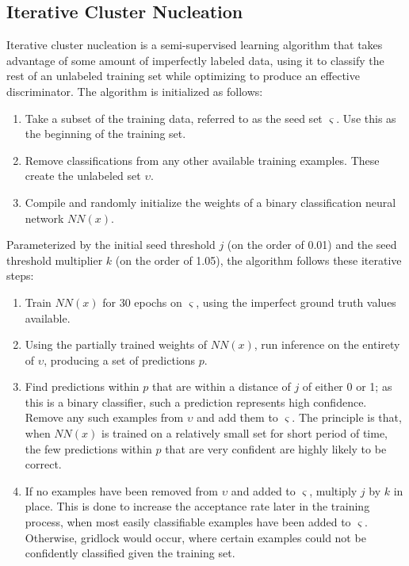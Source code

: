 \documentclass[10pt]{article}
\begin{document}
\subsection{Iterative Cluster Nucleation}

Iterative cluster nucleation is a semi-supervised learning algorithm that takes advantage of some amount of imperfectly labeled data, using it to classify the rest of an unlabeled training set while optimizing to produce an effective discriminator. The algorithm is initialized as follows:

\begin{enumerate}
    \item Take a subset of the training data, referred to as the seed set $\varsigma$. Use this as the beginning of the training set.
    \item Remove classifications from any other available training examples. These create the unlabeled set $\upsilon$.
    \item Compile and randomly initialize the weights of a binary classification neural network $NN(x)$.
\end{enumerate}

Parameterized by the initial seed threshold $j$ (on the order of 0.01) and the seed threshold multiplier $k$ (on the order of 1.05), the algorithm follows these iterative steps:

\begin{enumerate}
    \item Train $NN(x)$ for 30 epochs on $\varsigma$, using the imperfect ground truth values available.
    \item Using the partially trained weights of $NN(x)$, run inference on the entirety of $\upsilon$, producing a set of predictions $p$.
    \item Find predictions within $p$ that are within a distance of $j$ of either 0 or 1; as this is a binary classifier, such a prediction represents high confidence. Remove any such examples from $\upsilon$ and add them to $\varsigma$. The principle is that, when $NN(x)$ is trained on a relatively small set for short period of time, the few predictions within $p$ that are very confident are highly likely to be correct.
    \item If no examples have been removed from $\upsilon$ and added to $\varsigma$, multiply $j$ by $k$ in place. This is done to increase the acceptance rate later in the training process, when most easily classifiable examples have been added to $\varsigma$. Otherwise, gridlock would occur, where certain examples could not be confidently classified given the training set.
\end{enumerate}
\end{document}
